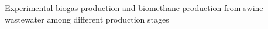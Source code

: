 Experimental biogas production and biomethane production from swine wastewater among different production stages